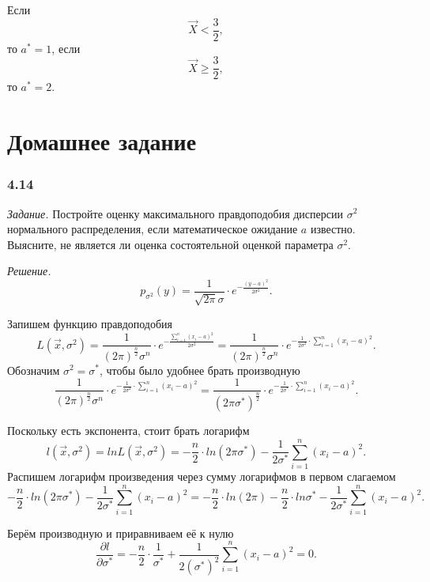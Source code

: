 Если
$$ \vec{X} <
  \frac{3}{2},$$
то $a^* = 1$, если
$$ \vec{X} \geq
  \frac{3}{2},$$
то $a^* = 2$.

\section*{Домашнее задание}

\subsubsection*{4.14}

\textit{Задание.}
Постройте оценку максимального правдоподобия дисперсии $ \sigma^2$ нормального распределения,
если математическое ожидание $a$ известно.
Выясните, не является ли оценка состоятельной оценкой параметра $ \sigma^2$.

\textit{Решение.}
$$p_{ \sigma^2} \left( y \right) =
  \frac{1}{ \sqrt{2 \pi } \sigma } \cdot e^{- \frac{ \left( y - a \right)^2}{2 \sigma^2}}.$$

Запишем функцию правдоподобия
$$L \left( \vec{x}, \sigma^2 \right) =
  \frac{1}{ \left( 2 \pi \right)^{ \frac{n}{2}} \sigma^n} \cdot
  e^{- \frac{ \sum \limits_{i = 1}^n \left( x_i - a \right)^2}{2 \sigma^2}} =
  \frac{1}{ \left( 2 \pi \right)^{ \frac{n}{2}} \sigma^n} \cdot
  e^{- \frac{1}{2 \sigma^2} \cdot \sum \limits_{i = 1}^n \left( x_i - a \right)^2}.$$
Обозначим $ \sigma^2 = \sigma^*$, чтобы было удобнее брать производную
$$ \frac{1}{ \left( 2 \pi \right)^{ \frac{n}{2}} \sigma^n} \cdot
  e^{- \frac{1}{2 \sigma^2} \cdot \sum \limits_{i = 1}^n \left( x_i - a \right)^2} =
  \frac{1}{ \left( 2 \pi \sigma^* \right)^{ \frac{n}{2}}} \cdot
  e^{- \frac{1}{2 \sigma^*} \cdot \sum \limits_{i = 1}^n \left( x_i - a \right)^2}.$$

Поскольку есть экспонента, стоит брать логарифм
$$l \left( \vec{x}, \sigma^2 \right) =
  ln L \left( \vec{x}, \sigma^2 \right) =
  - \frac{n}{2} \cdot ln \left( 2 \pi \sigma^* \right) -
  \frac{1}{2 \sigma^*} \sum \limits_{i = 1}^n \left( x_i - a \right)^2.$$
Распишем логарифм произведения через сумму логарифмов в первом слагаемом
$$- \frac{n}{2} \cdot ln \left( 2 \pi \sigma^* \right) -
  \frac{1}{2 \sigma^*} \sum \limits_{i = 1}^n \left( x_i - a \right)^2 =
  - \frac{n}{2} \cdot ln \left( 2 \pi \right) -
  \frac{n}{2} \cdot ln \sigma^* -
  \frac{1}{2 \sigma^*} \sum \limits_{i = 1}^n \left( x_i - a \right)^2.$$

Берём производную и приравниваем её к нулю
$$ \frac{ \partial l}{ \partial \sigma^*} =
  - \frac{n}{2} \cdot \frac{1}{ \sigma^*} +
  \frac{1}{2 \left( \sigma^* \right)^2} \sum \limits_{i = 1}^n \left( x_i - a \right)^2 =
  0.$$

